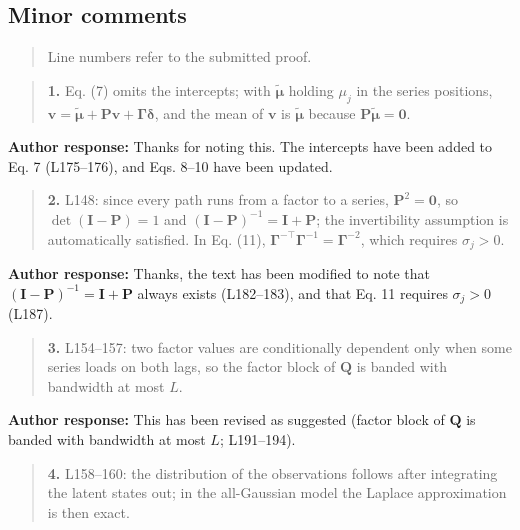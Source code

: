 \documentclass[11pt]{article}
\begin{document}
\subsection{Minor comments}\label{minor-comments}

\begin{quote}
Line numbers refer to the submitted proof.
\end{quote}

\begin{quote}
\textbf{1.} Eq. (7) omits the intercepts; with
\(\tilde{\boldsymbol{\mu}}\) holding \(\mu_j\) in the series positions,
\(\boldsymbol{v} = \tilde{\boldsymbol{\mu}} + \mathbf{P}\boldsymbol{v} + \mathbf{\Gamma}\boldsymbol{\delta}\),
and the mean of \(\boldsymbol{v}\) is \(\tilde{\boldsymbol{\mu}}\)
because \(\mathbf{P}\tilde{\boldsymbol{\mu}} = \boldsymbol{0}\).
\end{quote}

\textbf{Author response:} Thanks for noting this. The intercepts have
been added to Eq. 7 (L175--176), and Eqs. 8--10 have been updated.

\begin{quote}
\textbf{2.} L148: since every path runs from a factor to a series,
\(\mathbf{P}^2 = \mathbf{0}\), so \(\det(\mathbf{I} - \mathbf{P}) = 1\)
and \((\mathbf{I} - \mathbf{P})^{-1} = \mathbf{I} + \mathbf{P}\); the
invertibility assumption is automatically satisfied. In Eq. (11),
\(\mathbf{\Gamma}^{-\top}\mathbf{\Gamma}^{-1} = \mathbf{\Gamma}^{-2}\),
which requires \(\sigma_j > 0\).
\end{quote}

\textbf{Author response:} Thanks, the text has been modified to note
that \((\mathbf{I} - \mathbf{P})^{-1} = \mathbf{I} + \mathbf{P}\) always
exists (L182--183), and that Eq. 11 requires \(\sigma_j > 0\) (L187).

\begin{quote}
\textbf{3.} L154--157: two factor values are conditionally dependent
only when some series loads on both lags, so the factor block of
\(\mathbf{Q}\) is banded with bandwidth at most \(L\).
\end{quote}

\textbf{Author response:} This has been revised as suggested (factor
block of \(\mathbf{Q}\) is banded with bandwidth at most \(L\);
L191--194).

\begin{quote}
\textbf{4.} L158--160: the distribution of the observations follows
after integrating the latent states out; in the all-Gaussian model the
Laplace approximation is then exact.
\end{quote}
\end{document}
